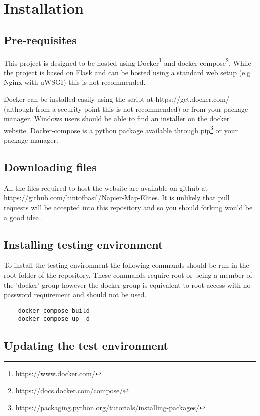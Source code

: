 \section{Installation}

\subsection{Pre-requisites}

This project is designed to be hosted using Docker\footnote{https://www.docker.com/} and docker-compose\footnote{https://docs.docker.com/compose/}.  While the project is based on Flask and can be hosted using a standard web setup (e.g Nginx with uWSGI) this is not recommended.

Docker can be installed easily using the script at https://get.docker.com/ (although from a security point this is not recommended) or from your package manager.  Windows users should be able to find an installer on the docker website.  Docker-compose is a python package available through pip\footnote{https://packaging.python.org/tutorials/installing-packages/} or your package manager.

\subsection{Downloading files}

All the files required to host the website are available on github at https://github.com/hintofbasil/Napier-Map-Elites.  It is unlikely that pull requests will be accepted into this repository and so you should forking would be a good idea.

\subsection{Installing testing environment}

To install the testing environment the following commands should be run in the root folder of the repository.  These commands require root or being a member of the 'docker' group however the docker group is equivalent to root access with no password requirement and should not be used.

\begin{verbatim}
	docker-compose build
	docker-compose up -d
\end{verbatim}

\subsection{Updating the test environment}

